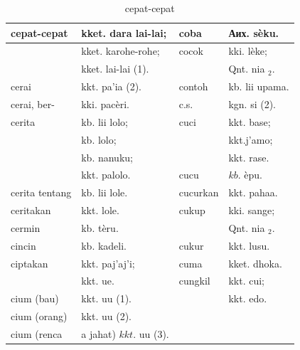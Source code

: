 \documentclass[10pt]{article}
\begin{document}
\begin{table}[h]
\begin{center}
\captionsetup{labelformat=empty}
\caption{cepat-cepat}
\begin{tabular}{|l|l|l|l|}
\hline
cepat-cepat & kket. dara lai-lai; & coba & Аих. sèku. \\
\hline
 & kket. karohe-rohe; & cocok & kki. lèke; \\
\hline
 & kket. lai-lai (1). &  & Qnt. nia \({ }_{2}\). \\
\hline
cerai & kkt. pa'ia (2). & contoh & kb. lii upama. \\
\hline
cerai, ber- & kki. pacèri. & c.s. & kgn. si (2). \\
\hline
cerita & kb. lii lolo; & cuci & kkt. base; \\
\hline
 & kb. lolo; &  & kkt.j'amo; \\
\hline
 & kb. nanuku; &  & kkt. rase. \\
\hline
 & kkt. palolo. & cucu & \(k b\). èpu. \\
\hline
cerita tentang & kb. lii lole. & cucurkan & kkt. pahaa. \\
\hline
ceritakan & kkt. lole. & cukup & kki. sange; \\
\hline
cermin & kb. tèru. &  & Qnt. nia \({ }_{2}\). \\
\hline
cincin & kb. kadeli. & cukur & kkt. lusu. \\
\hline
ciptakan & kkt. paj'aj'i; & cuma & kket. dhoka. \\
\hline
 & kkt. ue. & cungkil & kkt. cui; \\
\hline
cium (bau) & kkt. uu (1). &  & kkt. edo. \\
\hline
cium (orang) & kkt. uu (2). &  &  \\
\hline
cium (renca & a jahat) \(k k t\). uu (3). &  &  \\
\hline
\end{tabular}
\end{center}
\end{table}
\end{document}
